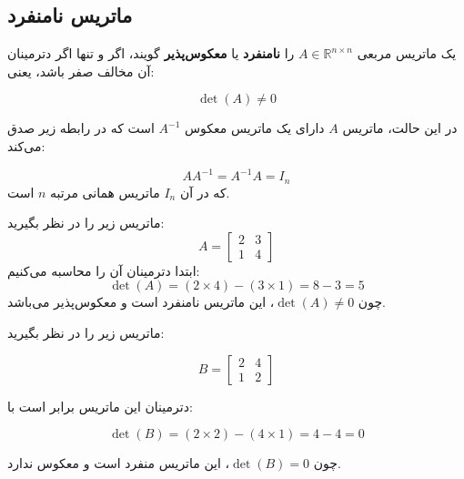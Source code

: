 \subsection{ ماتریس نامنفرد}
\begin{definition}
	یک ماتریس مربعی $A \in \mathbb{R}^{n \times n}$ را \textbf{نامنفرد} یا \textbf{معکوس‌پذیر} گویند، اگر و تنها اگر دترمینان آن مخالف صفر باشد، یعنی:
	
	\[
	\det(A) \neq 0
	\]
	
	در این حالت، ماتریس $A$ دارای یک ماتریس معکوس $A^{-1}$ است که  در رابطه زیر صدق می‌کند:
	
	\[
	A A^{-1} = A^{-1} A = I_n
	\]
	که در آن $I_n$ ماتریس همانی مرتبه $n$ است.
\end{definition}
\begin{example}
ماتریس زیر را در نظر بگیرید:
\[
A = \begin{bmatrix} 2 & 3 \\ 1 & 4 \end{bmatrix}
\]
ابتدا دترمینان آن را محاسبه می‌کنیم:
\[
\det(A) = (2 \times 4) - (3 \times 1) = 8 - 3 = 5
\]
چون $\det(A) \neq 0$، این ماتریس نامنفرد است و معکوس‌پذیر می‌باشد.
\end{example}
\begin{example}
	ماتریس زیر را در نظر بگیرید:
	
	\[
	B = \begin{bmatrix} 2 & 4 \\ 1 & 2 \end{bmatrix}
	\]
	
	دترمینان این ماتریس برابر است با:
	
	\[
	\det(B) = (2 \times 2) - (4 \times 1) = 4 - 4 = 0
	\]
	
	چون $\det(B) = 0$، این ماتریس منفرد است و معکوس ندارد.
\end{example}
